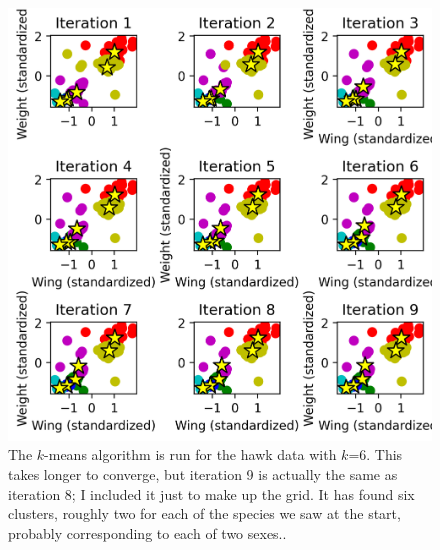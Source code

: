 \documentclass[12pt]{article}
\begin{document}
\begin{figure}[htb]
\begin{center}  
  \includegraphics{04.1_khawks_k6.png}
\end{center}
\caption{The $k$-means algorithm is run for the hawk data with
  $k$=6. This takes longer to converge, but iteration 9 is actually
  the same as iteration 8; I included it just to make up the grid. It
  has found six clusters, roughly two for each of the species we saw
  at the start, probably corresponding to each of two
  sexes..\label{fig:khawksk6}}
\end{figure}
\end{document}
